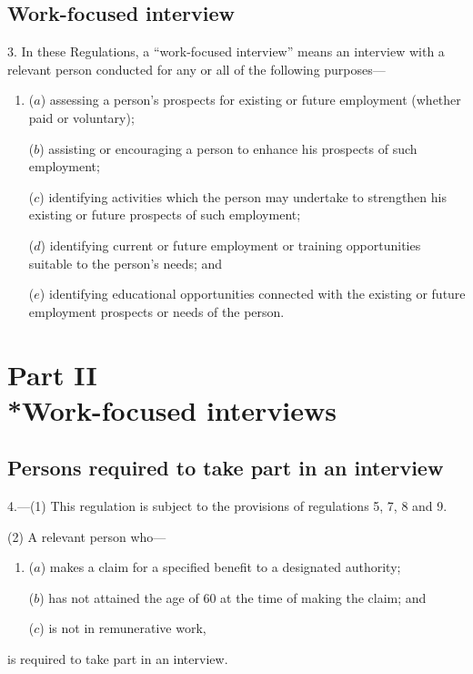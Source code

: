 \documentclass[12pt,a4paper]{article}
\begin{document}
\subsection[3. Work-focused interview]{Work-focused interview}

3.  In these Regulations, a “work-focused interview” means an interview with a relevant person conducted for any or all of the following purposes—
\begin{enumerate}\item[]
($a$) assessing a person’s prospects for existing or future employment (whether paid or voluntary);

($b$) assisting or encouraging a person to enhance his prospects of such employment;

\begin{sloppypar}
($c$) identifying activities which the person may undertake to strengthen his existing or future prospects of such employment;
\end{sloppypar}

($d$) identifying current or future employment or training opportunities suitable to the person’s needs; and

($e$) identifying educational opportunities connected with the existing or future employment prospects or needs of the person.
\end{enumerate}

\section[Part II — Work-focused interviews]{Part II\\*Work-focused interviews}

\renewcommand\parthead{— Part II}

\subsection[4. Persons required to take part in an interview]{Persons required to take part in an interview}

4.—(1)  This regulation is subject to the provisions of regulations 5, 7, 8 and 9.

(2) A relevant person who—
\begin{enumerate}\item[]
($a$)  makes a claim for a specified benefit to a designated authority;

($b$) has not attained the age of 60 at the time of making the claim; and

($c$) is not in remunerative work,
\end{enumerate}
is required to take part in an interview.
\end{document}
